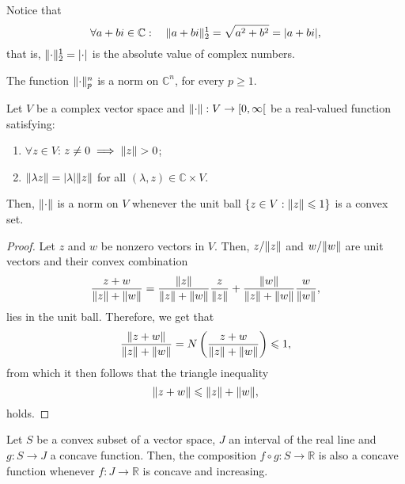 Notice that
\[
  \forall{a+bi\in\mathbb{C}}:\quad{\lVert a+bi\rVert^{1}_{2}=\sqrt{a^{2}+b^{2}}=\lvert a+bi\rvert},
\]
that is, \(\lVert\cdot\rVert^{1}_{2}=\lvert\cdot\rvert\) is the absolute value of complex numbers.

\begin{proposition}\label{proposition:the-p-norm-is-in-fact-a-norm}
  The function \(\lVert\cdot\rVert^{n}_{p}\) is a norm on \(\mathbb{C}^{n}\), for every \(p\geqslant{1}\).
\end{proposition}

\begin{lemma}\label{lemma:on-norms-and-the-convexity-of-the-unitary-closed-ball}
  Let \(V\) be a complex vector space and \(\norm{\cdot}:V\to\rinterval{0}{\infty}\) be a real-valued function satisfying:
  \begin{enumerate}
    \item
      \(\forall{z\in{V}}\): \(z\neq{0}\implies\lVert z\rVert>0\);
    \item
      \(\lVert\lambda{z}\rVert=\lvert\lambda\rvert\lVert z\rVert\) for all
      \((\lambda,z)\in\mathbb{C}\times{V}\).
  \end{enumerate}
  Then, \(\lVert\cdot\rVert\) is a norm on \(V\) whenever the unit ball \(\left\{z\in{V}:\lVert z\rVert\leqslant{1}\right\}\) is a convex set.
\end{lemma}

\begin{proof}
  Let \(z\) and \(w\) be nonzero vectors in \(V\). Then, \(z/\lVert z\rVert\) and
  \(w/\lVert w\rVert\) are unit vectors and their convex combination
  \[
    \frac{z+w}{\lVert z\rVert+\lVert w\rVert}
    =
    \frac{\lVert z\rVert}{\lVert z\rVert+\lVert w\rVert}\frac{z}{\lVert z\rVert}
    +
    \frac{\lVert w\rVert}{\lVert z\rVert+\lVert w\rVert}\frac{w}{\lVert w\rVert}
    ,
  \]
  lies in the unit ball. Therefore, we get that
  \[
    \frac{\lVert z+w\rVert}{\lVert z\rVert+\lVert w\rVert}
    =
    N\left(\frac{z+w}{\lVert z\rVert+\lVert w\rVert}\right)\leqslant{1},
  \]
  from which it then follows that the triangle inequality
  \[
    \lVert z+w\rVert\leqslant{\lVert z\rVert+\lVert w\rVert},
  \]
  holds.
\end{proof}

\begin{lemma}\label{lemma:concavity-of-compositions-of-concave-functions}
  Let \(S\) be a convex subset of a vector space, \(J\) an interval of the real
  line and \(g:S\to{J}\) a concave function. Then, the composition
  \(f\circ{g}:S\to\mathbb{R}\) is also a concave function whenever \(f:J\to\mathbb{R}\)
  is concave and increasing.
\end{lemma}

